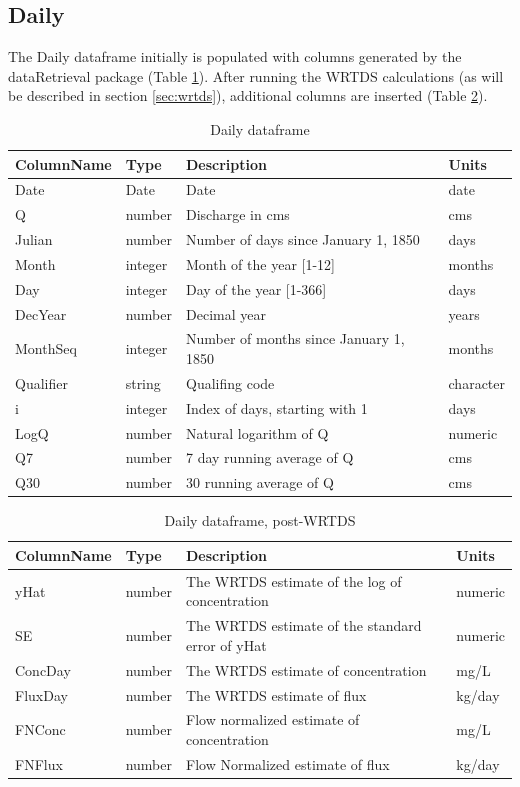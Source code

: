 \documentclass[a4paper,11pt]{article}\usepackage{graphicx, color}
\begin{document}
\subsection{Daily}
\label{sec:dataframesDaily}
The Daily dataframe initially is populated with columns generated by the dataRetrieval package (Table \ref{table:Daily1}).  After running the WRTDS calculations (as will be described in section \ref{sec:wrtds}), additional columns are inserted (Table \ref{table:Daily2}).

\begin{table}[!ht]
\centering
\caption{Daily dataframe} 
\label{table:Daily1}
\begin{tabular}{llll}
  \hline
ColumnName & Type & Description & Units \\ 
  \hline
  Date & Date & Date & date \\ 
  Q & number & Discharge in cms & cms \\ 
  Julian & number & Number of days since January 1, 1850 & days \\ 
  Month & integer & Month of the year [1-12] & months \\ 
  Day & integer & Day of the year [1-366] & days \\ 
  DecYear & number & Decimal year & years \\ 
  MonthSeq & integer & Number of months since January 1, 1850 & months \\ 
  Qualifier & string & Qualifing code & character \\ 
  i & integer & Index of days, starting with 1 & days \\ 
  LogQ & number & Natural logarithm of Q & numeric \\ 
  Q7 & number & 7 day running average of Q & cms \\ 
  Q30 & number & 30 running average of Q & cms \\ 
   \hline
\end{tabular}
\end{table}

\begin{table}[!ht]
\centering
\caption{Daily dataframe, post-WRTDS} 
\label{table:Daily2}
\begin{tabular}{llll}
  \hline
ColumnName & Type & Description & Units \\ 
  \hline
yHat & number & The WRTDS estimate of the log of concentration & numeric \\ 
  SE & number & The WRTDS estimate of the standard error of yHat & numeric \\ 
  ConcDay & number & The WRTDS estimate of concentration & mg/L \\ 
  FluxDay & number & The WRTDS estimate of flux & kg/day \\ 
  FNConc & number & Flow normalized estimate of concentration & mg/L \\ 
  FNFlux & number & Flow Normalized estimate of flux & kg/day \\ 
   \hline
\end{tabular}
\end{table}
\end{document}
